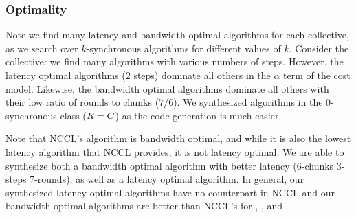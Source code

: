 \subsubsection{Optimality}
Note we find many latency and bandwidth optimal algorithms for each
collective, as we search over $k$-synchronous algorithms for different
values of $k$. Consider the \allgather collective: we find many
algorithms with various numbers of steps. However, the latency optimal
algorithms (2 steps) dominate all others in the $\alpha$ term of the
cost model.  Likewise, the bandwidth optimal algorithms dominate all
others with their low ratio of rounds to chunks ($7/6$). We
synthesized algorithms in the $0$-synchronous class ($R =
C$) as the code generation is much easier.


Note that NCCL's \allgather algorithm is bandwidth optimal, and while
it is also the lowest latency algorithm that NCCL provides, it is not
latency optimal. We are able to synthesize both a bandwidth optimal
algorithm with better latency (6-chunks 3-steps 7-rounds), as well as
a latency optimal algorithm. In general, our synthesized latency
optimal algorithms have no counterpart in NCCL and our bandwidth
optimal algorithms are better than NCCL's for \allgather, \broadcast,
and \reduce.


